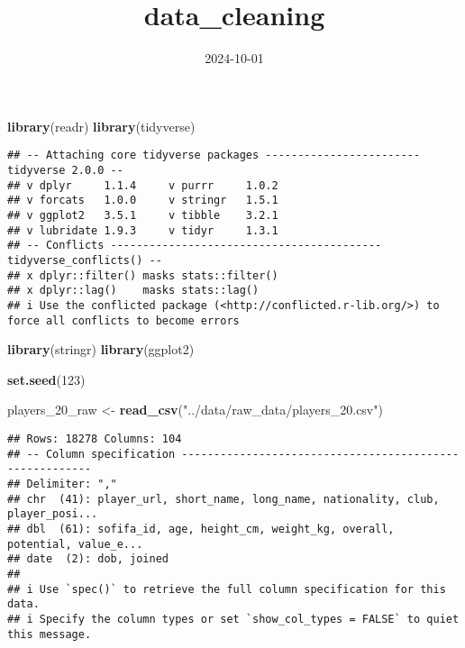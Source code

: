 \documentclass[
]{article}
\title{data\_cleaning}
\author{}
\date{\vspace{-2.5em}2024-10-01}
\newenvironment{Shaded}{\begin{snugshade}}{\end{snugshade}}
\newcommand{\DecValTok}[1]{\textcolor[rgb]{0.00,0.00,0.81}{#1}}
\newcommand{\FunctionTok}[1]{\textcolor[rgb]{0.13,0.29,0.53}{\textbf{#1}}}
\newcommand{\NormalTok}[1]{#1}
\newcommand{\OtherTok}[1]{\textcolor[rgb]{0.56,0.35,0.01}{#1}}
\newcommand{\StringTok}[1]{\textcolor[rgb]{0.31,0.60,0.02}{#1}}
\begin{document}
\maketitle

\begin{Shaded}
\begin{Highlighting}[]
\FunctionTok{library}\NormalTok{(readr)}
\FunctionTok{library}\NormalTok{(tidyverse)}
\end{Highlighting}
\end{Shaded}

\begin{verbatim}
## -- Attaching core tidyverse packages ------------------------ tidyverse 2.0.0 --
## v dplyr     1.1.4     v purrr     1.0.2
## v forcats   1.0.0     v stringr   1.5.1
## v ggplot2   3.5.1     v tibble    3.2.1
## v lubridate 1.9.3     v tidyr     1.3.1
## -- Conflicts ------------------------------------------ tidyverse_conflicts() --
## x dplyr::filter() masks stats::filter()
## x dplyr::lag()    masks stats::lag()
## i Use the conflicted package (<http://conflicted.r-lib.org/>) to force all conflicts to become errors
\end{verbatim}

\begin{Shaded}
\begin{Highlighting}[]
\FunctionTok{library}\NormalTok{(stringr)}
\FunctionTok{library}\NormalTok{(ggplot2)}
\end{Highlighting}
\end{Shaded}

\begin{Shaded}
\begin{Highlighting}[]
\FunctionTok{set.seed}\NormalTok{(}\DecValTok{123}\NormalTok{)}

\NormalTok{players\_20\_raw }\OtherTok{\textless{}{-}} \FunctionTok{read\_csv}\NormalTok{(}\StringTok{"../data/raw\_data/players\_20.csv"}\NormalTok{)}
\end{Highlighting}
\end{Shaded}

\begin{verbatim}
## Rows: 18278 Columns: 104
## -- Column specification --------------------------------------------------------
## Delimiter: ","
## chr  (41): player_url, short_name, long_name, nationality, club, player_posi...
## dbl  (61): sofifa_id, age, height_cm, weight_kg, overall, potential, value_e...
## date  (2): dob, joined
## 
## i Use `spec()` to retrieve the full column specification for this data.
## i Specify the column types or set `show_col_types = FALSE` to quiet this message.
\end{verbatim}
\end{document}
